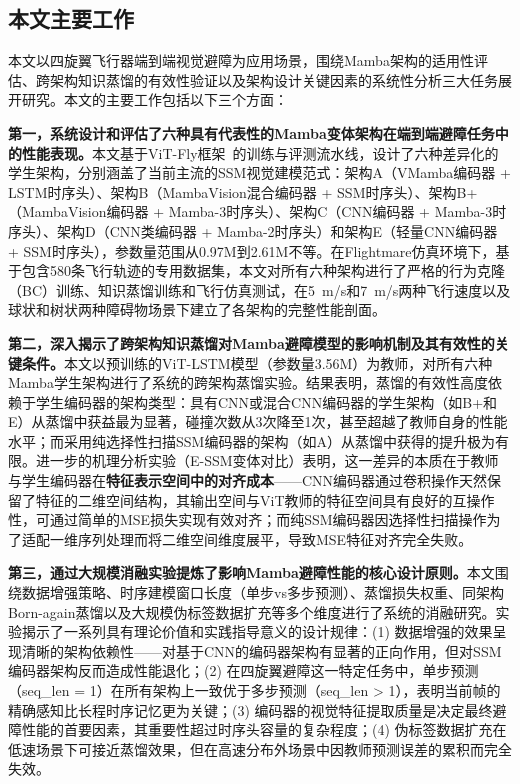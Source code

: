 \documentclass[12pt,a4paper]{article}
\numberwithin{equation}{section}
\numberwithin{figure}{section}
\numberwithin{table}{section}
\begin{document}
\subsection{本文主要工作}

本文以四旋翼飞行器端到端视觉避障为应用场景，围绕Mamba架构的适用性评估、跨架构知识蒸馏的有效性验证以及架构设计关键因素的系统性分析三大任务展开研究。本文的主要工作包括以下三个方面：

\textbf{第一，系统设计和评估了六种具有代表性的Mamba变体架构在端到端避障任务中的性能表现。}本文基于ViT-Fly框架~\cite{bhattacharya2024vitfly}的训练与评测流水线，设计了六种差异化的学生架构，分别涵盖了当前主流的SSM视觉建模范式：架构A（VMamba编码器 + LSTM时序头）、架构B（MambaVision混合编码器 + SSM时序头）、架构B+（MambaVision编码器 + Mamba-3时序头）、架构C（CNN编码器 + Mamba-3时序头）、架构D（CNN类编码器 + Mamba-2时序头）和架构E（轻量CNN编码器 + SSM时序头），参数量范围从0.97M到2.61M不等。在Flightmare仿真环境下，基于包含580条飞行轨迹的专用数据集，本文对所有六种架构进行了严格的行为克隆（BC）训练、知识蒸馏训练和飞行仿真测试，在5~m/s和7~m/s两种飞行速度以及球状和树状两种障碍物场景下建立了各架构的完整性能剖面。

\textbf{第二，深入揭示了跨架构知识蒸馏对Mamba避障模型的影响机制及其有效性的关键条件。}本文以预训练的ViT-LSTM模型（参数量3.56M）为教师，对所有六种Mamba学生架构进行了系统的跨架构蒸馏实验。结果表明，蒸馏的有效性高度依赖于学生编码器的架构类型：具有CNN或混合CNN编码器的学生架构（如B+和E）从蒸馏中获益最为显著，碰撞次数从3次降至1次，甚至超越了教师自身的性能水平；而采用纯选择性扫描SSM编码器的架构（如A）从蒸馏中获得的提升极为有限。进一步的机理分析实验（E-SSM变体对比）表明，这一差异的本质在于教师与学生编码器在\textbf{特征表示空间中的对齐成本}——CNN编码器通过卷积操作天然保留了特征的二维空间结构，其输出空间与ViT教师的特征空间具有良好的互操作性，可通过简单的MSE损失实现有效对齐；而纯SSM编码器因选择性扫描操作为了适配一维序列处理而将二维空间维度展平，导致MSE特征对齐完全失败。

\textbf{第三，通过大规模消融实验提炼了影响Mamba避障性能的核心设计原则。}本文围绕数据增强策略、时序建模窗口长度（单步vs多步预测）、蒸馏损失权重、同架构Born-again蒸馏以及大规模伪标签数据扩充等多个维度进行了系统的消融研究。实验揭示了一系列具有理论价值和实践指导意义的设计规律：(1) 数据增强的效果呈现清晰的架构依赖性——对基于CNN的编码器架构有显著的正向作用，但对SSM编码器架构反而造成性能退化；(2) 在四旋翼避障这一特定任务中，单步预测（seq\_len = 1）在所有架构上一致优于多步预测（seq\_len > 1），表明当前帧的精确感知比长程时序记忆更为关键；(3) 编码器的视觉特征提取质量是决定最终避障性能的首要因素，其重要性超过时序头容量的复杂程度；(4) 伪标签数据扩充在低速场景下可接近蒸馏效果，但在高速分布外场景中因教师预测误差的累积而完全失效。
\end{document}
